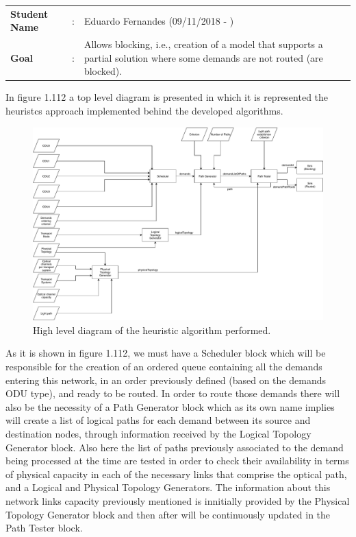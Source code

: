 \begin{tcolorbox}	
	\begin{tabular}{p{2.75cm} p{0.2cm} p{10.5cm}} 	
		\textbf{Student Name}   &:& Eduardo Fernandes    (09/11/2018 - )\\
		\textbf{Goal}           &:& Allows blocking, i.e., creation of a model that supports a partial solution where some demands are not routed (are blocked).
	\end{tabular}
\end{tcolorbox}

 \vspace{11pt}
 In figure 1.112 a top level diagram is presented in which it is represented the heuristcs approach implemented behind the developed algorithms. %

\begin{figure}[H]
	\centering
	\includegraphics[width=15cm]{sdf/heuristic/transparent_survivability/figures/fluxogramaSemGroomingHighLevel}
	\caption{High level diagram of the heuristic algorithm performed.}
	\label{fluxogram_transparent_surv}
\end{figure}

As it is shown in figure 1.112, we must have a Scheduler block which will be responsible for the creation of an ordered queue containing all the demands entering this network, in an order previously defined (based on the demands ODU type), and ready to be routed. 
In order to route those demands there will also be the necessity of a Path Generator block which as its own name implies will create a list of logical paths for each demand between its source and destination nodes, through information received by the Logical Topology Generator block. 
Also here the list of paths previously associated to the demand being processed at the time are tested in order to check their availability in terms of physical capacity in each of the necessary links that comprise the optical path, and a Logical and Physical Topology Generators. The information about this network links capacity previously mentioned is innitially provided by the Physical Topology Generator block and then after will be continuously updated in the Path Tester block.


